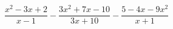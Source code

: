 \begin{ex}[type=expression]
	\begin{condition}
		\(\dfrac{x^2-3x+2}{x-1}-\dfrac{3x^2+7x-10}{3x+10}-\dfrac{5-4x-9x^2}{x+1}\)
	\end{condition}
\end{ex}